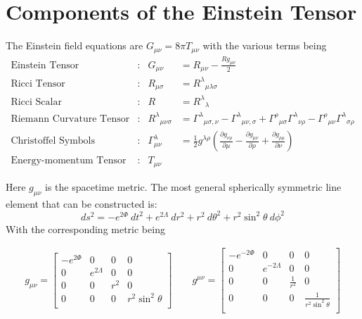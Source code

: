 \documentclass[a4paper,12pt,onehalfspacing]{report}
\begin{document}
\section{Components of the Einstein Tensor}

The Einstein field equations are $G_{\mu \nu }=8\pi T_{\mu \nu }$ with the various terms being \cite{MTW_GR}
\begin{align*}
    \text{Einstein Tensor}&:& G_{\mu \nu }&=R_{\mu \nu }-\frac{R g_{\mu \nu }}{2}\\[5pt]
    \text{Ricci Tensor}&:& R_{\mu \sigma }&=R^{\lambda }{}_{\mu \lambda \sigma }\\[5pt]
    \text{Ricci Scalar}&:& R&= R^\lambda{}_\lambda\\[5pt]
    \text{Riemann Curvature Tensor}&:& R^{\lambda }{}_{\mu \nu \sigma }&=\Gamma ^{\lambda }{}_{\mu \sigma ,\nu }- \Gamma ^{\lambda }{}_{\mu \nu ,\sigma }+\Gamma ^{\rho }{}_{\mu \sigma } \Gamma ^{\lambda }{}_{\nu \rho }- \Gamma ^{\rho }{}_{\mu \nu } \Gamma ^{\lambda }{}_{\sigma \rho }\\[5pt]
    \text{Christoffel Symbols}&:& \Gamma ^{\lambda }_{\mu \nu }&=\frac{1}{2} g^{\lambda \rho }\left(\frac{\partial g_{\nu \rho }}{\partial \mu }-\frac{\partial g_{\mu \nu }}{\partial \rho }+\frac{\partial g_{\rho \mu }}{\partial \nu }\right)\\[5pt]
    \text{Energy-momentum Tensor}&:& T_{\mu\nu}
\end{align*}

Here $g_{\mu\nu}$ is the spacetime metric. The most general spherically symmetric line element that can be constructed is: \cite{MTW_GR}
\begin{equation}
    ds^2= - e^{2\Phi}\ dt^2+  e^{2\Lambda}\ dr^2+r^2\ d\theta^2+r^2\sin^2\theta\ d\phi^2\label{eq: ds2}
\end{equation}
With the corresponding metric being

\begin{align}
    g_{\mu\nu}= \begin{bmatrix}
        - e^{2\Phi} & 0 & 0 & 0 \\
        0 &  e^{2\Lambda} & 0 & 0 \\
        0 & 0 & r^2 & 0 \\
        0 & 0 & 0 & r^2\sin^2\theta \\
    \end{bmatrix}\qquad  
    g^{\mu\nu}= \begin{bmatrix}
        - e^{-2\Phi} & 0 & 0 & 0 \\
        0 &  e^{-2\Lambda} & 0 & 0 \\
        0 & 0 & \frac{1}{r^2} & 0 \\
        0 & 0 & 0 & \frac{1}{r^2\sin^2\theta} \\
    \end{bmatrix}\label{eq: metric}
\end{align}
\end{document}
